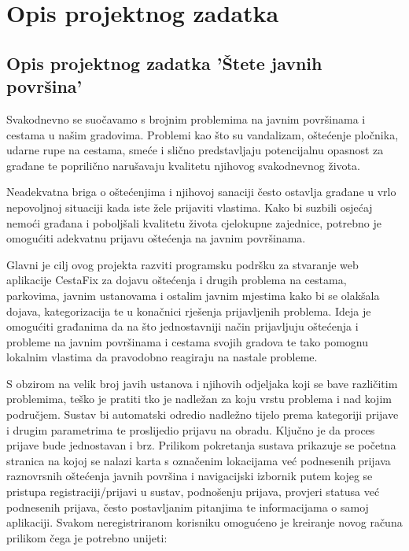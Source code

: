 \chapter{Opis projektnog zadatka}

\section{Opis projektnog zadatka 'Štete javnih površina'}

\noindent Svakodnevno se suočavamo s brojnim problemima na javnim površinama i cestama u našim gradovima. Problemi kao što su vandalizam, oštećenje pločnika, udarne rupe na cestama, smeće i slično predstavljaju potencijalnu opasnost za građane te poprilično narušavaju kvalitetu njihovog svakodnevnog života.

\noindent Neadekvatna briga o oštećenjima i njihovoj sanaciji često ostavlja građane u vrlo nepovoljnoj situaciji kada iste žele prijaviti vlastima. Kako bi suzbili osjećaj nemoći građana i poboljšali kvalitetu života cjelokupne zajednice, potrebno je omogućiti adekvatnu prijavu oštećenja na javnim površinama.

\noindent Glavni je cilj ovog projekta razviti programsku podršku za stvaranje web aplikacije
CestaFix za dojavu oštećenja i drugih problema na cestama, parkovima, javnim ustanovama i ostalim javnim mjestima kako bi se olakšala dojava, kategorizacija te u konačnici rješenja prijavljenih problema. Ideja je omogućiti građanima da na što jednostavniji način prijavljuju oštećenja i probleme na javnim površinama i cestama svojih gradova te tako pomognu lokalnim vlastima da pravodobno reagiraju na nastale probleme.

\noindent S obzirom na velik broj javih ustanova i njihovih odjeljaka koji se bave različitim problemima, teško je pratiti tko je nadležan za koju vrstu problema i nad kojim područjem. Sustav bi automatski odredio nadležno tijelo prema kategoriji prijave i drugim parametrima te proslijedio prijavu na obradu. Ključno je da proces prijave bude jednostavan i brz.
\noindent Prilikom pokretanja sustava prikazuje se početna stranica na kojoj se nalazi karta s označenim lokacijama već podnesenih prijava raznovrsnih oštećenja javnih površina i navigacijski izbornik putem kojeg se pristupa registraciji/prijavi u sustav, podnošenju prijava, provjeri statusa već podnesenih prijava, često postavljanim pitanjima te informacijama o samoj aplikaciji.
\noindent Svakom neregistriranom korisniku omogućeno je kreiranje novog računa prilikom čega je potrebno unijeti:

